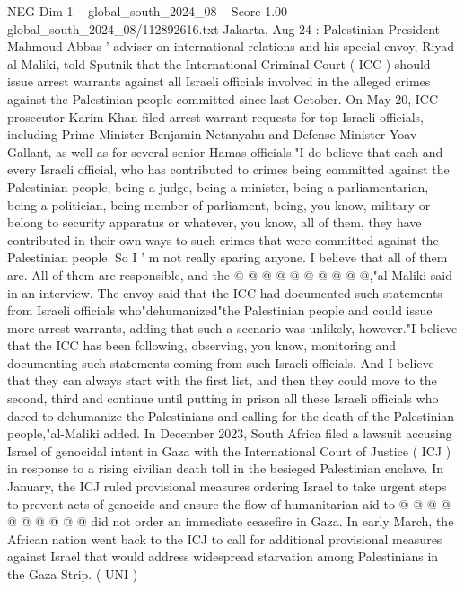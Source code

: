 \begin{textsample}{NEG Dim 1 – global\_south\_2024\_08 – Score 1.00 – global\_south\_2024\_08/112892616.txt}  \label{ex:f1_neg_441}
Jakarta, Aug 24 : Palestinian President Mahmoud Abbas ' adviser on international relations and his special envoy, Riyad al-Maliki, told Sputnik that the International Criminal Court ( ICC ) should issue arrest warrants against all Israeli officials involved in the alleged crimes against the Palestinian people committed since last October.
On May 20, ICC prosecutor Karim Khan filed arrest warrant requests for top Israeli officials, including Prime Minister Benjamin Netanyahu and Defense Minister Yoav Gallant, as well as for several senior Hamas officials."I do believe that each and every Israeli official, who has contributed to crimes being committed against the Palestinian people, being a judge, being a minister, being a parliamentarian, being a politician, being member of parliament, being, you know, military or belong to security apparatus or whatever, you know, all of them, they have contributed in their own ways to such crimes that were committed against the Palestinian people.
So I ' m not really sparing anyone.
I believe that all of them are.
All of them are responsible, and the @ @ @ @ @ @ @ @ @ @,"al-Maliki said in an interview.
The envoy said that the ICC had documented such statements from Israeli officials who"dehumanized"the Palestinian people and could issue more arrest warrants, adding that such a scenario was unlikely, however."I believe that the ICC has been following, observing, you know, monitoring and documenting such statements coming from such Israeli officials.
And I believe that they can always start with the first list, and then they could move to the second, third and continue until putting in prison all these Israeli officials who dared to dehumanize the Palestinians and calling for the death of the Palestinian people,"al-Maliki added.
In December 2023, South Africa filed a lawsuit accusing Israel of genocidal intent in Gaza with the International Court of Justice ( ICJ ) in response to a rising civilian death toll in the besieged Palestinian enclave.
In January, the ICJ ruled provisional measures ordering Israel to take urgent steps to prevent acts of genocide and ensure the flow of humanitarian aid to @ @ @ @ @ @ @ @ @ @ did not order an immediate ceasefire in Gaza.
In early March, the African nation went back to the ICJ to call for additional provisional measures against Israel that would address widespread starvation among Palestinians in the Gaza Strip. ( UNI )

\end{textsample}

